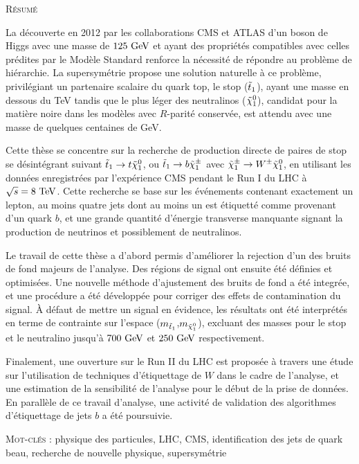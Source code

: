 \begin{framed}
    \vspace*{-0.7cm}
\begin{center}\textsc{Résumé}\end{center}
    \vspace*{-0.4cm}
    La découverte en 2012 par les collaborations CMS et ATLAS d'un boson de
    Higgs avec une masse de $125~\text{GeV}$ et ayant des propriétés compatibles avec
    celles prédites par le Modèle Standard renforce la nécessité de répondre au
    problème de hiérarchie. La supersymétrie propose une solution naturelle à ce
    problème, privilégiant un partenaire scalaire du quark top, le stop
    ($\tilde{t}_1$), ayant une masse en dessous du TeV tandis que le plus léger des
    neutralinos ($\tilde{\chi}_1^0$), candidat pour la matière noire dans les
    modèles avec $R$-parité conservée, est attendu avec une masse de quelques
    centaines de GeV.

    Cette thèse se concentre sur la recherche de production directe de paires de
    stop se désintégrant suivant $\tilde{t}_1 \rightarrow t \tilde{\chi}_1^0$, ou $\tilde{t}_1
    \rightarrow b \tilde{\chi}_1^\pm$ avec $\tilde{\chi}_1^\pm \rightarrow W^\pm \tilde{\chi}_1^0$,
    en utilisant les données enregistrées par l'expérience CMS pendant le Run I
    du LHC à $\sqrt{s} = 8~\text{TeV}$. Cette recherche se base sur les événements
    contenant exactement un lepton, au moins quatre jets dont au moins un est
    étiquetté comme provenant d'un quark $b$, et une grande quantité d'énergie
    transverse manquante signant la production de neutrinos et possiblement de
    neutralinos.

    Le travail de cette thèse a d'abord permis d'améliorer la rejection d'un des
    bruits de fond majeurs de l'analyse. Des régions de signal ont ensuite été
    définies et optimisées.  Une nouvelle méthode d'ajustement des bruits de
    fond a été integrée, et une procédure a été développée pour corriger des
    effets de contamination du signal. À défaut de mettre un signal en évidence,
    les résultats ont été interprétés en terme de contrainte sur l'espace
    ($m_{\tilde{t}_1}$,$m_{\tilde{\chi}_1^0}$), excluant des masses pour le stop et
    le neutralino jusqu'à $700~\text{GeV}$ et $250~\text{GeV}$ respectivement.

    Finalement, une ouverture sur le Run II du LHC est proposée à travers une
    étude sur l'utilisation de techniques d'étiquettage de $W$ dans le cadre de
    l'analyse, et une estimation de la sensibilité de l'analyse pour le début de
    la prise de données. En parallèle de ce travail d'analyse, une activité de
    validation des algorithmes d'étiquettage de jets $b$ a été poursuivie.

    \textsc{Mot-clés} : physique des particules, LHC, CMS, identification des
    jets de quark beau, recherche de nouvelle physique, supersymétrie
\end{framed}
